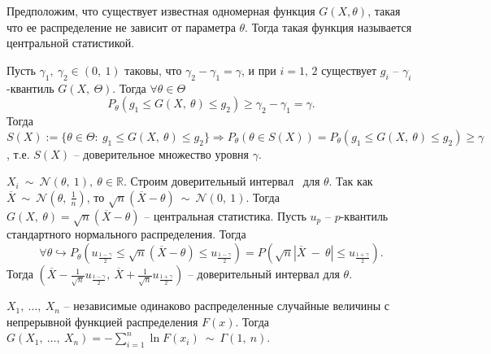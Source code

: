 \begin{definition}
    Предположим, что существует известная одномерная функция $\displaystyle G( X,\theta )$, такая что ее распределение не зависит от параметра $\displaystyle \theta $. Тогда такая функция называется центральной статистикой.
\end{definition}
Пусть $\displaystyle \gamma _{1} ,\ \gamma _{2} \in ( 0,\ 1)$ таковы, что $\displaystyle \gamma _{2} -\gamma _{1} =\gamma $, и при $\displaystyle i=1,\, 2$ существует $\displaystyle g_{i}$ -- $\displaystyle \gamma _{i}$-квантиль $\displaystyle G( X,\ \Theta )$. Тогда $\displaystyle \forall \theta \in \Theta $
\begin{equation*}
    P_{\theta }( g_{1} \leqslant G( X,\ \theta ) \leqslant g_{2}) \geqslant \gamma _{2} -\gamma _{1} =\gamma .
\end{equation*}
Тогда $\displaystyle S( X) :=\{\theta \in \Theta :\ g_{1} \leqslant G( X,\ \theta ) \leqslant g_{2}\} \Rightarrow P_{\theta }( \theta \in S( X)) =P_{\theta }( g_{1} \leqslant G( X,\ \theta ) \leqslant g_{2}) \geqslant \gamma $, т.е. $\displaystyle S( X)$ -- доверительное множество уровня $\displaystyle \gamma $.
\begin{example}
$\displaystyle X_{i} \ \sim \ \mathcal{N}( \theta ,\ 1) ,\ \theta \in \mathbb{R}$. Строим доверительный интервал \ для $\displaystyle \theta $. Так как $\displaystyle \overline{X} \ \sim \ \mathcal{N}\left( \theta ,\ \frac{1}{n}\right)$, то $\displaystyle \sqrt{n}(\overline{X} -\theta ) \ \sim \ \mathcal{N}( 0,\ 1)$. Тогда $\displaystyle G( X,\ \theta ) =\sqrt{n}(\overline{X} -\theta )$ -- центральная статистика. Пусть $\displaystyle u_{p}$ -- $\displaystyle p$-квантиль стандартного нормального распределения. Тогда
\begin{equation*}
\forall \theta \hookrightarrow P_{\theta }\left( u_{\frac{1-\gamma }{2}} \leqslant \sqrt{n}(\overline{X} -\theta ) \leqslant u_{\frac{1-\gamma }{2}}\right) =P\left(\sqrt{n}| \overline{X} \ -\ \theta | \leqslant u_{\frac{1+\gamma }{2}}\right) .
\end{equation*}
Тогда $\displaystyle \left(\overline{X} -\frac{1}{\sqrt{n}} u_{\frac{1-\gamma }{2}} ,\ \overline{X} +\frac{1}{\sqrt{n}} u_{\frac{1+\gamma }{2}}\right)$ -- доверительный интервал для $\displaystyle \theta $.
\end{example}
\begin{lemma}
$\displaystyle X_{1} ,\ \dotsc ,\ X_{n}$ -- независимые одинаково распределенные случайные величины с непрерывной функцией распределения $\displaystyle F( x)$. Тогда $\displaystyle G( X_{1} ,\ \dotsc ,\ X_{n}) =-\sum _{i=1}^{n}\ln F( x_{i}) \ \sim \ \Gamma ( 1,\ n)$.
\end{lemma}
